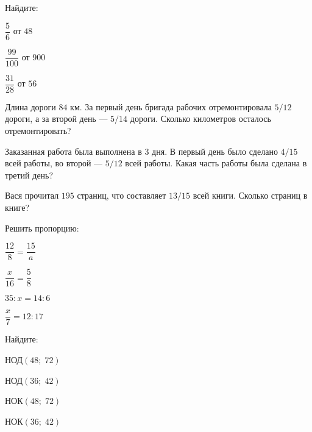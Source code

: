 \begin{listofex}
	\item Найдите:
	\begin{enumcols}[itemcolumns=3]
		\item \( \dfrac{5}{6} \) от \( 48 \)
		\item \( \dfrac{99}{100} \) от \( 900 \)
		\item \( \dfrac{31}{28} \) от \( 56 \)
	\end{enumcols}
	\item Длина дороги \( 84 \) км. За первый день бригада рабочих отремонтировала \( 5/12 \) дороги, а за второй день --- \( 5/14 \) дороги. Сколько километров осталось отремонтировать?
	\item Заказанная работа была выполнена в \( 3 \) дня. В первый день было сделано \( 4/15 \) всей работы, во второй --- \( 5/12 \) всей работы. Какая часть работы была сделана в третий день?
	\item Вася прочитал \( 195 \) страниц, что составляет \( 13/15 \) всей книги. Сколько страниц в книге?
	\item Решить пропорцию:
	\begin{enumcols}[itemcolumns=4]
		\item \( \dfrac{12}{8}=\dfrac{15}{a} \)
		\item \( \dfrac{x}{16}=\dfrac{5}{8} \)
		\item \( 35:x=14:6 \)
		\item \( \dfrac{x}{7}=12:17 \)
	\end{enumcols}
	\item Найдите:
	\begin{enumcols}[itemcolumns=4]
		\item НОД\( (48;\;72) \)
		\item НОД\( (36;\;42) \)
		\item НОК\( (48;\;72) \)
		\item НОК\( (36;\;42) \)
	\end{enumcols}
\end{listofex}
%
%
%
%
%
%
%
